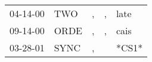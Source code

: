 \begin{supertabular}{p{0.07\textwidth}p{0.06\textwidth}p{0.02\textwidth}p{0.02\textwidth}p{0.06\textwidth}}
 04-14-00\textsuperscript{} &   TWO\textsuperscript{} &  , &  , &  late\textsuperscript{} \\
 09-14-00\textsuperscript{} &  ORDE\textsuperscript{} &  , &  , &  cais\textsuperscript{} \\
 03-28-01\textsuperscript{} &  SYNC\textsuperscript{} &  , &    &                   *CS1* \\
\end{supertabular}
